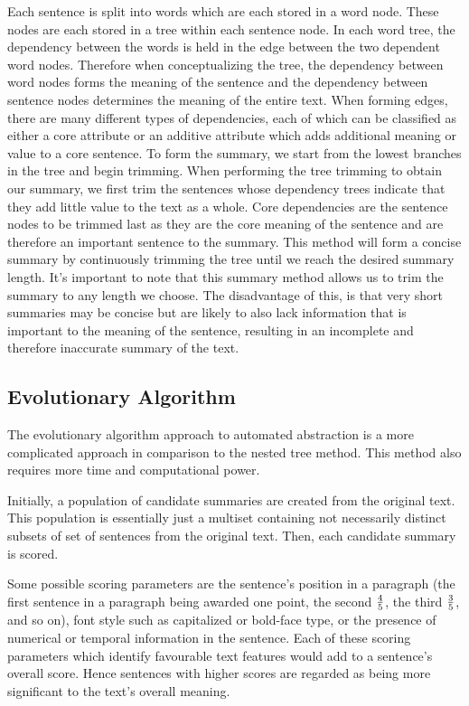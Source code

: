 Each sentence is split into words which are each stored in a word node. These nodes are each stored in a tree within each sentence node. In each word tree, the dependency between the words is held in the edge between the two dependent word nodes. Therefore when conceptualizing the tree, the dependency between word nodes forms the meaning of the sentence and the dependency between sentence nodes determines the meaning of the entire text. When forming edges, there are many different types of dependencies, each of which can be classified as either a core attribute or an additive attribute which adds additional meaning or value to a core sentence. To form the summary, we start from the lowest branches in the tree and begin trimming. When performing the tree trimming to obtain our summary, we first trim the sentences whose dependency trees indicate that they add little value to the text as a whole. Core dependencies are the sentence nodes to be trimmed last as they are the core meaning of the sentence and are therefore an important sentence to the summary. This method will form a concise summary by continuously trimming the tree until we reach the desired summary length. It's important to note that this summary method allows us to trim the summary to any length we choose. The disadvantage of this, is that very short summaries may be concise but are likely to also lack information that is important to the meaning of the sentence, resulting in an incomplete and therefore inaccurate summary of the text. 

\subsection{Evolutionary Algorithm}
The evolutionary algorithm approach to automated abstraction is a more complicated approach in comparison to the nested tree method. This method also requires more time and computational power.

Initially, a population of candidate summaries are created from the original text. This population is essentially just a multiset containing not necessarily distinct subsets of set of sentences from the original text. Then, each candidate summary is scored.

Some possible scoring parameters are the sentence's position in a paragraph (the first sentence in a paragraph being awarded one point, the second $4 \over 5$, the third $3\over 5$, and so on), font style such as capitalized or bold-face type, or the presence of numerical or temporal information in the sentence. Each of these scoring parameters which identify favourable text features would add to a sentence's overall score. Hence sentences with higher scores are regarded as being more significant to the text's overall meaning.

